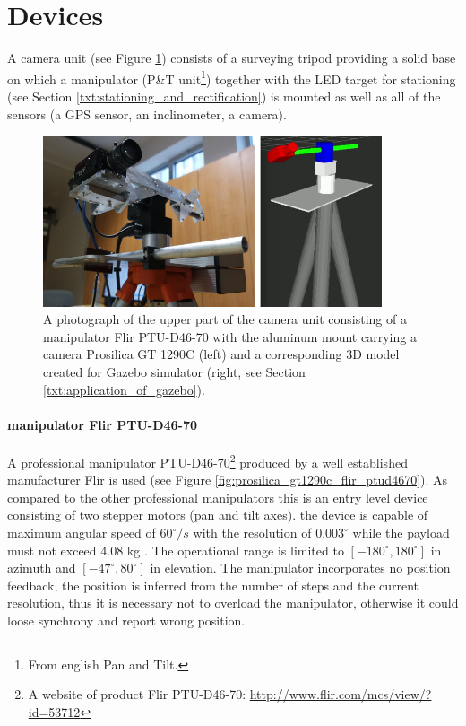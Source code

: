 \section{Devices} \label{txt:devices}

A camera unit (see Figure \ref{fig:camera_unit_photo_model}) consists of a surveying tripod providing a solid base on which a manipulator (P\&T unit\footnote{From english Pan and Tilt.}) together with the LED target for stationing (see Section \ref{txt:stationing_and_rectification}) is mounted as well as all of the sensors (a GPS sensor, an inclinometer, a camera).

\begin{figure}[htb]
	\centering
	\includegraphics[width=10cm]{fig/camera_unit_photo_model.jpg}
	\caption{A photograph of the upper part of the camera unit consisting of a manipulator Flir PTU-D46-70 with the aluminum mount carrying a camera Prosilica GT 1290C (left) and a corresponding 3D model created for Gazebo simulator (right, see Section \ref{txt:application_of_gazebo}).}
	\label{fig:camera_unit_photo_model}
\end{figure}

\paragraph{manipulator Flir PTU-D46-70} A professional manipulator PTU-D46-70\footnote{A website of product Flir PTU-D46-70: \url{http://www.flir.com/mcs/view/?id=53712}} produced by a well established manufacturer Flir is used (see Figure \ref{fig:prosilica_gt1290c_flir_ptud4670}). As compared to the other professional manipulators this is an entry level device consisting of two stepper motors (pan and tilt axes). the device is capable of maximum angular speed of $60^{\circ}/s$ with the resolution of $0.003^{\circ}$ while the payload must not exceed 4.08 kg \cite{Flir_ptud4670}. The operational range is limited to $[-180^{\circ}, 180^{\circ}]$ in azimuth and $[-47^{\circ}, 80^{\circ}]$ in elevation. The manipulator incorporates no position feedback, the position is inferred from the number of steps and the current resolution, thus it is necessary not to overload the manipulator, otherwise it could loose synchrony and report wrong position. 

